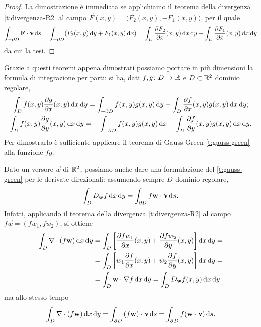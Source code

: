 \begin{proof}
	La dimostrazione è immediata se applichiamo il teorema della divergenza \ref{t:divergenza-R2} al campo $\vec F(x,y)=\big(F_2(x,y),-F_1(x,y)\big)$, per il quale
	\begin{equation}
		\int_{+\partial D}{\mathbf{F}}\cdot{\bm{\upnu}}\,\textup{d} s=\int_{+\partial D}(F_2(x,y)\,\textup{d} y+F_1(x,y)\,\textup{d} x)=\int_D\frac{\partial {F_2}}{\partial {x}}(x,y)\,\textup{d} x\,\textup{d} y-\int_D\frac{\partial {F_1}}{\partial {x}}(x,y)\,\textup{d} x\,\textup{d} y
	\end{equation}
	da cui la tesi.
\end{proof}
Grazie a questi teoremi appena dimostrati possiamo portare in più dimensioni la formula di integrazione per parti: si ha, dati $f,g\colon D\to\mathbb{R}$ e $D\subset\mathbb{R}^2$ dominio regolare,
\begin{gather}
	\int_D f(x,y)\frac{\partial {g}}{\partial {x}}(x,y)\,\textup{d} x\,\textup{d} y=\int_{+\partial D}f(x,y)g(x,y)\,\textup{d} y-\int_D\frac{\partial {f}}{\partial {x}}(x,y)g(x,y)\,\textup{d} x\,\textup{d} y;\\
	\int_D f(x,y)\frac{\partial {g}}{\partial {y}}(x,y)\,\textup{d} x\,\textup{d} y=-\int_{+\partial D}f(x,y)g(x,y)\,\textup{d} x-\int_D\frac{\partial {f}}{\partial {y}}(x,y)g(x,y)\,\textup{d} x\,\textup{d} y.
\end{gather}
Per dimostrarlo è sufficiente applicare il teorema di Gauss-Green \ref{t:gauss-green} alla funzione $fg$.

Dato un versore $\vec w$ di $\mathbb{R}^2$, possiamo anche dare una formulazione del \ref{t:gauss-green} per le derivate direzionali: assumendo sempre $D$ dominio regolare,
\begin{equation}
	\int_DD_{\mathbf{w}}f\,\textup{d} x\,\textup{d} y=\int_{\partial D}f{\mathbf{w}}\cdot{\bm{\upnu}}\,\textup{d} s.
\end{equation}
Infatti, applicando il teorema della divergenza \ref{t:divergenza-R2} al campo $f\vec w=(fw_1,fw_2)$, si ottiene
\begin{equation}
	\begin{split}
		\int_D\nabla\cdot(f\mathbf{w})\,\textup{d} x\,\textup{d} y&=\int_D\bigg[\frac{\partial {fw_1}}{\partial {x}}(x,y)+\frac{\partial {fw_2}}{\partial {y}}(x,y)\bigg]\,\textup{d} x\,\textup{d} y=\\
		&=\int_D\bigg[w_1\frac{\partial {f}}{\partial {x}}(x,y)+w_2\frac{\partial {f}}{\partial {y}}(x,y)\bigg]\,\textup{d} x\,\textup{d} y=\\
		&=\int_D{\mathbf{w}}\cdot{\nabla f}\,\textup{d} x\,\textup{d} y=\int_DD_{\mathbf{w}}f(x,y)\,\textup{d} x\,\textup{d} y
	\end{split}
\end{equation}
ma allo stesso tempo
\begin{equation}
	\int_D\nabla\cdot(f\mathbf{w})\,\textup{d} x\,\textup{d} y=\int_{\partial D}{(f\mathbf{w})}\cdot{\bm{\upnu}}\,\textup{d} s=\int_{\partial D}f({\mathbf{w}}\cdot{\bm{\upnu}})\,\textup{d} s.
\end{equation}

